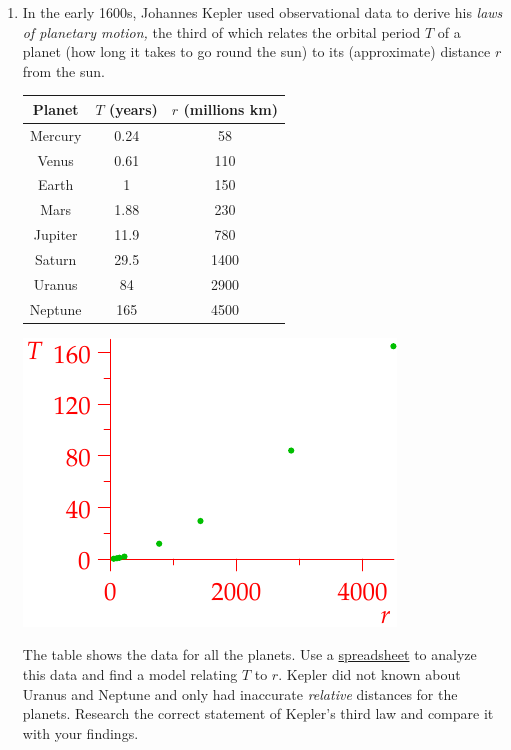 \begin{exercises}{}{}
\begin{enumerate}
  
  \item In the early 1600s, Johannes Kepler used observational data to derive his \emph{laws of planetary motion,} the third of which relates the orbital period $T$ of a planet (how long it takes to go round the sun) to its (approximate) distance $r$ from the sun.

	\begin{minipage}[t]{0.6\linewidth}\vspace{0pt}
	\centering\begin{tabular}{c|c|c}
	Planet&$T$ (years)&$r$ (millions km)\\\hline\hline
	Mercury & 0.24 & 58\\
	Venus & 0.61 & 110\\
	Earth & 1 & 150\\
	Mars & 1.88 & 230\\
	Jupiter & 11.9 & 780\\
	Saturn & 29.5 & 1400\\
	Uranus & 84 & 2900\\
	Neptune & 165 & 4500
	\end{tabular}
	\end{minipage}\begin{minipage}[t]{0.4\linewidth}\vspace{0pt}
	\flushright\includegraphics{kepler}
	\end{minipage}\par
	The table shows the data for all the planets. Use a \href{http://math.uci.edu/~ndonalds/math8/kepler.xlsx}{spreadsheet} to analyze this data and find a model relating $T$ to $r$.\smallbreak
	Kepler did not known about Uranus and Neptune and only had inaccurate \emph{relative} distances for the planets. Research the correct statement of Kepler's third law and compare it with your findings.
\end{enumerate}
\end{exercises}